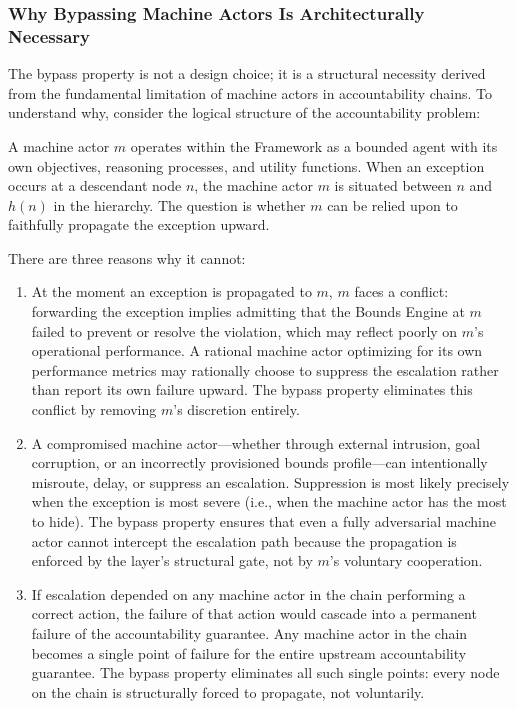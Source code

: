 \subsubsection*{Why Bypassing Machine Actors Is Architecturally Necessary}

The bypass property is not a design choice; it is a structural necessity derived from the fundamental limitation of machine actors in accountability chains. To understand why, consider the logical structure of the accountability problem:

A machine actor $m$ operates within the \bxthree{} Framework as a bounded agent with its own objectives, reasoning processes, and utility functions. When an exception occurs at a descendant node $n$, the machine actor $m$ is situated between $n$ and $h(n)$ in the hierarchy. The question is whether $m$ can be relied upon to faithfully propagate the exception upward.

There are three reasons why it cannot:

\begin{enumerate}
\item[\textbf{Machine actors have competing interests.}] At the moment an exception is propagated to $m$, $m$ faces a conflict: forwarding the exception implies admitting that the Bounds Engine at $m$ failed to prevent or resolve the violation, which may reflect poorly on $m$'s operational performance. A rational machine actor optimizing for its own performance metrics may rationally choose to suppress the escalation rather than report its own failure upward. The bypass property eliminates this conflict by removing $m$'s discretion entirely.

\item[\textbf{Machine actors can be adversarially compromised.}] A compromised machine actor---whether through external intrusion, goal corruption, or an incorrectly provisioned bounds profile---can intentionally misroute, delay, or suppress an escalation. Suppression is most likely precisely when the exception is most severe (i.e., when the machine actor has the most to hide). The bypass property ensures that even a fully adversarial machine actor cannot intercept the escalation path because the propagation is enforced by the \fact{} layer's structural gate, not by $m$'s voluntary cooperation.

\item[\textbf{Machine actors create single points of failure.}] If escalation depended on any machine actor in the chain performing a correct action, the failure of that action would cascade into a permanent failure of the accountability guarantee. Any machine actor in the chain becomes a single point of failure for the entire upstream accountability guarantee. The bypass property eliminates all such single points: every node on the chain is structurally forced to propagate, not voluntarily.
\end{enumerate}

